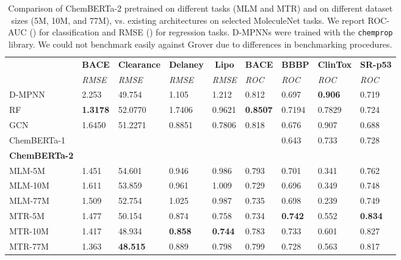 \documentclass{article}
\begin{document}
\begin{table}[H]
\small
    \begin{tabular}{@{}lllll|llll@{}}
        \toprule
         & \multicolumn{1}{c}{\textbf{BACE}} & \multicolumn{1}{c}{\textbf{Clearance}} & \multicolumn{1}{c}{\textbf{Delaney}} & 
         \multicolumn{1}{c}{\textbf{Lipo}}
         & \multicolumn{1}{c}{\textbf{BACE}} & \multicolumn{1}{c}{\textbf{BBBP}} & \multicolumn{1}{c}{\textbf{ClinTox}} & 
         \multicolumn{1}{c}{\textbf{SR-p53}}  \\ 



& \textit{RMSE} & \textit{RMSE} & \textit{RMSE} & \textit{RMSE} & \textit{ROC} 
        & \textit{ROC} & \textit{ROC} & \textit{ROC} \\
         \midrule
        D-MPNN & 2.253 & 49.754 & 1.105 & 1.212 & 0.812 & 0.697 & \textbf{0.906} & 0.719\\
        RF & \textbf{1.3178} & 52.0770 & 1.7406 & 0.9621 & \textbf{0.8507} & 0.7194 & 0.7829 & 0.724 \\
        GCN & 1.6450 & 51.2271 & 0.8851 & 0.7806 & 0.818 & 0.676 & 0.907 & 0.688 \\
        ChemBERTa-1 & & & & & & 0.643 & 0.733 & 0.728 \\
        \midrule

        \textbf{ChemBERTa-2}\\
        MLM-5M & 1.451 & 54.601 & 0.946 & 0.986 & 0.793 & 0.701 & 0.341 & 0.762\\
        MLM-10M & 1.611 & 53.859 & 0.961 & 1.009 & 0.729 & 0.696 & 0.349 & 0.748\\
        MLM-77M & 1.509 & 52.754 & 1.025 & 0.987 & 0.735 & 0.698 & 0.239 & 0.749\\
        MTR-5M & 1.477 & 50.154 & 0.874 & 0.758 & 0.734 & \textbf{0.742} & 0.552 & \textbf{0.834}\\
        MTR-10M & 1.417 & 48.934 & \textbf{0.858} & \textbf{0.744} & 0.783 & 0.733 & 0.601 & 0.827\\
        MTR-77M & 1.363 & \textbf{48.515} & 0.889 & 0.798 & 0.799 & 0.728 & 0.563 & 0.817\\
        \bottomrule

         


\end{tabular}

\caption{\label{tab:main-results}Comparison of ChemBERTa-2 pretrained on different tasks (MLM and MTR) and on different dataset sizes (5M, 10M, and 77M), vs. existing architectures on selected MoleculeNet tasks. We report ROC-AUC  () for classification and RMSE () for regression tasks. D-MPNNs were trained with the \texttt{chemprop} \cite{yang2019analyzing} library. We could not benchmark easily against Grover \cite{rong2020self} due to differences in benchmarking procedures.}
\end{table}
\end{document}
